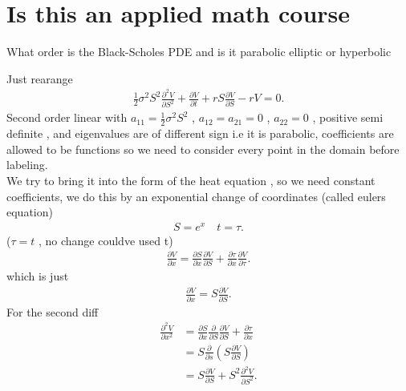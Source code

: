 \section{Is this an applied math course}
\begin{question}
 What order is the Black-Scholes PDE and is it parabolic elliptic or hyperbolic 
\end{question}
\begin{solution}
 Just rearange 
 \begin{align*}
  \frac{1}{2} \sigma ^2 S^2 \frac{\partial ^2 V}{\partial S^2} +  \frac{\partial V}{\partial t} + rS \frac{\partial V}{\partial S}  - rV = 0 
 .\end{align*}
 Second order linear with $a_{11} = \frac{1}{2} \sigma ^2 S^2$ , $a_{12} = a_{21} = 0$ , $a_{22} = 0$ , positive semi definite ,
 and eigenvalues are of different sign i.e it is parabolic, coefficients are allowed to be functions so we need to consider every point in the domain 
 before labeling. \\[1ex]
 We try to bring it into the form of the heat equation , so we need constant coefficients, 
 we do this by an exponential change of coordinates (called eulers equation)
 \begin{align*}
  S = e^{x}  \quad t = \tau  
 .\end{align*}
 ($\tau =t$ , no change couldve used t) 
 \begin{align*}
  \frac{\partial V}{\partial x}  = \frac{\partial S}{\partial x} \frac{\partial V}{\partial S}  + \frac{\partial \tau }{\partial x} \frac{\partial V}{\partial \tau } 
 .\end{align*}
 which is just
\begin{align*}
   \frac{\partial V}{\partial x}  = S \frac{\partial V}{\partial S}
.\end{align*}
For the second diff
\begin{align*}
  \frac{\partial ^2 V}{\partial x^2}  &= \frac{\partial S}{\partial x} \frac{\partial }{\partial S} \frac{\partial V}{\partial S} + \frac{\partial \tau }{\partial x} \\
                                      &= S \frac{\partial }{\partial s}(S \frac{\partial V}{\partial S} )  \\
                                      &= S \frac{\partial V}{\partial S} + S^2 \frac{\partial ^2 V}{\partial S^2} 
.\end{align*}
\end{solution}

